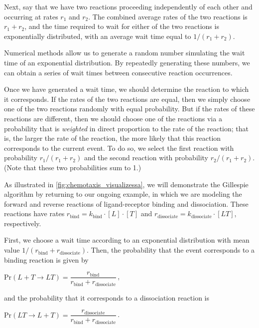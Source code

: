 Next, say that we have two reactions proceeding independently of each other and occurring at rates $r_1$ and $r_2$. The combined average rates of the two reactions is $r_1 + r_2$, and the time required to wait for either of the two reactions is exponentially distributed, with an average wait time equal to $1/(r_1 + r_2)$.

Numerical methods allow us to generate a random number simulating the wait time of an exponential distribution. By repeatedly generating these numbers, we can obtain a series of wait times between consecutive reaction occurrences.

Once we have generated a wait time, we should determine the reaction to which it corresponds. If the rates of the two reactions are equal, then we simply choose one of the two reactions randomly with equal probability. But if the rates of these reactions are different, then we should choose one of the reactions via a probability that is \textit{weighted} in direct proportion to the rate of the reaction; that is, the larger the rate of the reaction, the more likely that this reaction corresponds to the current event. To do so, we select the first reaction with probability $r_1/(r_1 + r_2)$ and the second reaction with probability $r_2/(r_1 + r_2)$. (Note that these two probabilities sum to 1.)

As illustrated in \autoref{fig:chemotaxis_visualizessa}, we will demonstrate the Gillespie algorithm by returning to our ongoing example, in which we are modeling the forward and reverse reactions of ligand-receptor binding and dissociation. These reactions have rates $r_\text{bind} = k_\text{bind} \cdot [L] \cdot [T]$ and $r_\text{dissociate} = k_\text{dissociate} \cdot [LT]$, respectively.

First, we choose a wait time according to an exponential distribution with mean value $1/(r_\text{bind} + r_\text{dissociate})$. Then, the probability that the event corresponds to a binding reaction is given by

\begin{center}
$\mathrm{Pr}(L + T \rightarrow LT) = \dfrac{r_\text{bind}}{r_\text{bind} + r_\text{dissociate}}$\,,
\end{center}

\noindent and the probability that it corresponds to a dissociation reaction is

\begin{center}
$\mathrm{Pr}(LT \rightarrow L + T) = \dfrac{r_\text{dissociate}}{r_\text{bind} + r_\text{dissociate}}$\,.
\end{center}

